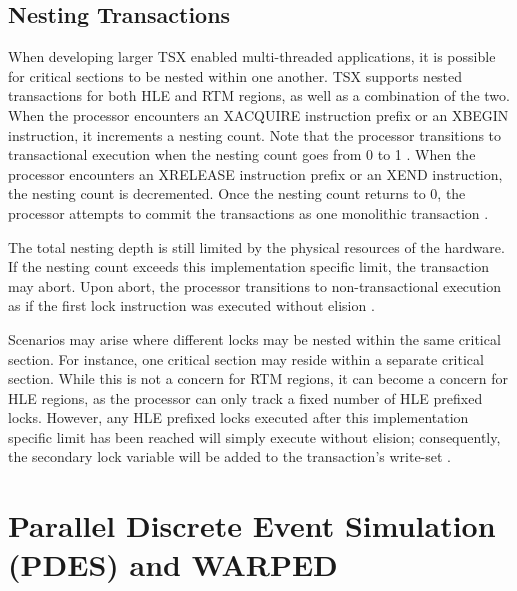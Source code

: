 \documentclass[a4paper]{article}
\begin{document}
\subsection{\textbf{Nesting Transactions}}

\indent
When developing larger TSX enabled multi-threaded applications, it is
possible for critical sections to be nested within one another.  TSX supports
nested transactions for both HLE and RTM regions, as well as a combination of
the two.  When the processor encounters an XACQUIRE instruction prefix or an 
XBEGIN instruction, it increments a nesting count.  Note that the processor
transitions to transactional execution when the nesting count goes from 0 to 1
\cite{intel_prog_ref}.  When the processor encounters an XRELEASE instruction
prefix or an XEND instruction, the nesting count is decremented.  Once the
nesting count returns to 0, the processor attempts to commit the transactions as
one monolithic transaction \cite{intel_prog_ref}.
\par

\indent
The total nesting depth is still limited by the physical resources of
the hardware.  If the nesting count exceeds this implementation specific limit,
the transaction may abort.  Upon abort, the processor transitions to
non-transactional execution as if the first lock instruction was executed
without elision \cite{intel_prog_ref}.
\par

\indent
Scenarios may arise where different locks may be nested within the same
critical section.  For instance, one critical section may reside within a
separate critical section.  While this is not a concern for RTM regions, it can
become a concern for HLE regions, as the processor can only track a fixed number
of HLE prefixed locks.  However, any HLE prefixed locks executed after this
implementation specific limit has been reached will simply execute without
elision; consequently, the secondary lock variable will be added to the
transaction's write-set \cite{intel_prog_ref}.
\par

\newpage
\section{\textbf{Parallel Discrete Event Simulation (PDES) and WARPED}}
\end{document}
